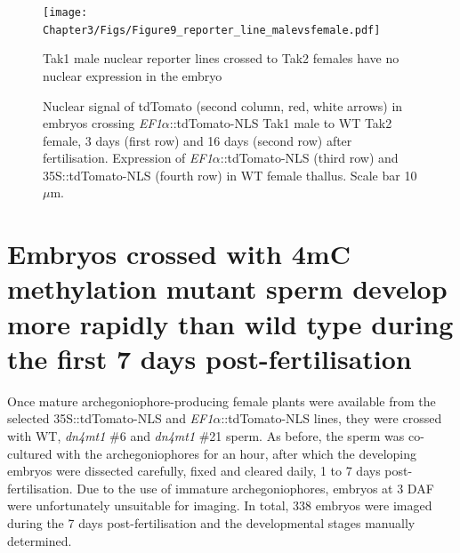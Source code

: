 \begin{figure}[htbp!] 
\centering    
    \texttt{[image: Chapter3/Figs/Figure9\_reporter\_line\_malevsfemale.pdf]}
\caption{Tak1 male nuclear reporter lines crossed to Tak2 females have no nuclear expression in the embryo}
\label{fig:malevsfemale}
\captionsetup{font=small}
    \caption*{Nuclear signal of tdTomato (second column, red, white arrows) in embryos crossing \textit{EF1$\alpha$}::tdTomato-NLS Tak1 male to WT Tak2 female, 3 days (first row) and 16 days (second row) after fertilisation. Expression of \textit{EF1$\alpha$}::tdTomato-NLS (third row) and  35S::tdTomato-NLS (fourth row) in WT female thallus. Scale bar 10$\mu$m.}
\end{figure}

\section{Embryos crossed with 4mC methylation mutant sperm develop more rapidly than wild type during the first 7 days post-fertilisation}

Once mature archegoniophore-producing female plants were available from the selected 35S::tdTomato-NLS and \textit{EF1$\alpha$}::tdTomato-NLS lines, they were crossed with WT, \textit{dn4mt1} \#6 and \textit{dn4mt1} \#21 sperm. As before, the sperm was co-cultured with the archegoniophores for an hour, after which the developing embryos were dissected carefully, fixed and cleared daily, 1 to 7 days post-fertilisation. Due to the use of immature archegoniophores, embryos at 3 DAF were unfortunately unsuitable for imaging. In total, 338 embryos were imaged during the 7 days post-fertilisation and the developmental stages manually determined. 

